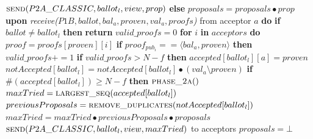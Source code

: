 \documentclass[algorithms,article,accept,moreauthors,pdftex,10pt,a4paper]{Definitions/mdpi}
\begin{document}
\begin{algorithm}[H]
\begin{algorithmic}[1]
\State \hspace{\algorithmicindent}\hspace{\algorithmicindent} $\Call{send}{P2A\_CLASSIC, ballot_l,view, prop}$
\State \hspace{\algorithmicindent} \textbf{else}
\State \hspace{\algorithmicindent}\hspace{\algorithmicindent} $proposals = proposals \bullet prop$
\State
\State \textbf{upon} \textit{receive($P1B, ballot, bal_a, proven,val_a, proofs$)} from acceptor $a$ \textbf{do}
\State \hspace{\algorithmicindent} \textbf{if} $ballot \neq ballot_l$ \textbf{then}
\State \hspace{\algorithmicindent}\hspace{\algorithmicindent} \textbf{return}
\State
\State \hspace{\algorithmicindent} $valid\_proofs = 0$
\State \hspace{\algorithmicindent} \textbf{for} $i$ \textbf{in} $acceptors$ \textbf{do}
\State \hspace{\algorithmicindent}\hspace{\algorithmicindent} $proof = proofs[proven][i]$
\State \hspace{\algorithmicindent}\hspace{\algorithmicindent} \textbf{if} $proof_{pub_i} == \langle bal_a, proven \rangle$ \textbf{then}
\State \hspace{\algorithmicindent}\hspace{\algorithmicindent}\hspace{\algorithmicindent} 
$valid\_proofs \mathrel{+{=}} 1$
\State
\State \hspace{\algorithmicindent} \textbf{if} $valid\_proofs > N-f$ \textbf{then}
\State \hspace{\algorithmicindent}\hspace{\algorithmicindent}\hspace{\algorithmicindent} $accepted[ballot_l][a] = proven$
\State \hspace{\algorithmicindent}\hspace{\algorithmicindent}\hspace{\algorithmicindent} $notAccepted[ballot_l] = notAccepted[ballot_l] \bullet (val_a \setminus proven)$
\State 
\State \hspace{\algorithmicindent}\hspace{\algorithmicindent} \textbf{if} $\#(accepted[ballot_l]) \geq N-f$ \textbf{then} 
\State \hspace{\algorithmicindent}\hspace{\algorithmicindent}\hspace{\algorithmicindent} $\Call{phase\_2a}{ }$
\State
{}
\State $maxTried = \Call{largest\_seq}{accepted[ballot_l]}$
\State $previousProposals = \Call{remove\_duplicates}{notAccepted[ballot_l]}$
\State $maxTried = maxTried \bullet previousProposals \bullet proposals$
\State $\Call{send}{P2A\_CLASSIC,ballot_l,view, maxTried}$ to acceptors
\State $proposals = \bot$
\EndFunction
\end{algorithmic}
\end{algorithm}
\end{document}
